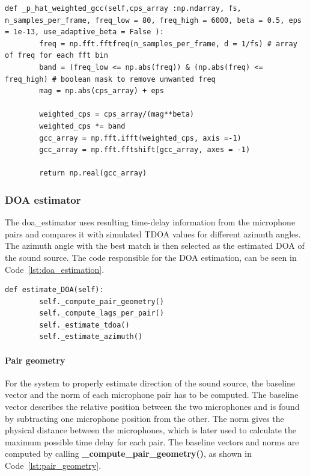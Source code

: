     \begin{lstlisting}[style=pythonstyle, caption={Function used to weight the CPS values.}, label={lst:phat_weighting}]
    def _p_hat_weighted_gcc(self,cps_array :np.ndarray, fs, n_samples_per_frame, freq_low = 80, freq_high = 6000, beta = 0.5, eps = 1e-13, use_adaptive_beta = False ):
        freq = np.fft.fftfreq(n_samples_per_frame, d = 1/fs) # array of freq for each fft bin
        band = (freq_low <= np.abs(freq)) & (np.abs(freq) <= freq_high) # boolean mask to remove unwanted freq
        mag = np.abs(cps_array) + eps
        
        weighted_cps = cps_array/(mag**beta)
        weighted_cps *= band 
        gcc_array = np.fft.ifft(weighted_cps, axis =-1)
        gcc_array = np.fft.fftshift(gcc_array, axes = -1)

        return np.real(gcc_array)
    \end{lstlisting}


        
    \subsubsection{DOA estimator}
    The doa\_estimator uses resulting time-delay information from the microphone pairs and compares it with simulated TDOA values for different azimuth angles. The azimuth angle with the best match is then selected as the estimated DOA of the sound source. The code responsible for the DOA estimation, can be seen in Code~\ref{lst:doa_estimation}.

    \begin{lstlisting}[style=pythonstyle, caption={Function used to estimate the DOA}, label={lst:doa_estimation}]
     def estimate_DOA(self):
        self._compute_pair_geometry()
        self._compute_lags_per_pair()
        self._estimate_tdoa()
        self._estimate_azimuth()
    \end{lstlisting}
    \newpage
    \paragraph{Pair geometry}
    For the system to properly estimate direction of the sound source, the baseline vector and the norm of each microphone pair has to be computed.
    The baseline vector describes the relative position between the two microphones and is found by subtracting one microphone position from the other. The norm gives the physical distance between the microphones, which is later used to calculate the maximum possible time delay for each pair. The baseline vectors and norms are computed by calling \textbf{\_compute\_pair\_geometry()}, as shown in Code~\ref{lst:pair_geometry}.\\  

